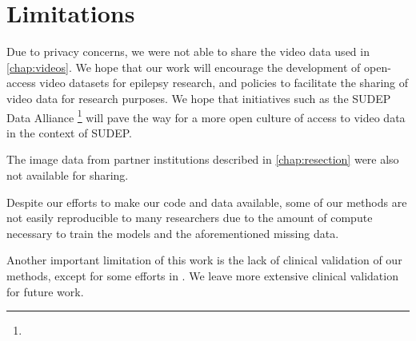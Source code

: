 \section{Limitations}

Due to privacy concerns, we were not able to share the video data used in \cref{chap:videos}.
We hope that our work will encourage the development of open-access video datasets for epilepsy research, and policies to facilitate the sharing of video data for research purposes.
We hope that initiatives such as the \acs{SUDEP} Data Alliance%
\footnote{}
will pave the way for a more open culture of access to video data in the context of \acs{SUDEP}.

The image data from partner institutions described in \cref{chap:resection} were also not available for sharing.

Despite our efforts to make our code and data available, some of our methods are not easily reproducible to many researchers due to the amount of compute necessary to train the models and the aforementioned missing data.

Another important limitation of this work is the lack of clinical validation of our methods, except for some efforts in \cite{alim-marvasti_probabilistic_2022}.
We leave more extensive clinical validation for future work.
